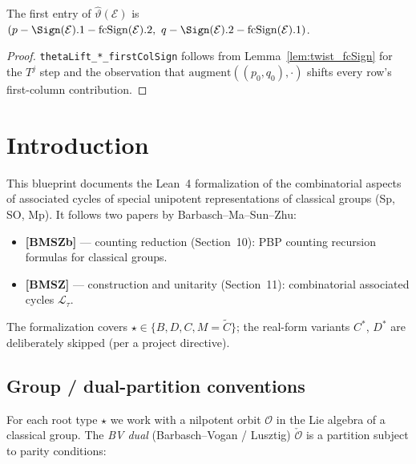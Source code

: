 \begin{theorem}
  \label{thm:thetaLift_first_entry}
  \leanok
  The first entry of $\hat\vartheta(\mathcal{E})$ is $(p - \Sign(\mathcal{E}).1 - \mathrm{fcSign}(\mathcal{E}).2,\ q - \Sign(\mathcal{E}).2 - \mathrm{fcSign}(\mathcal{E}).1)$.
\end{theorem}
\begin{proof}
  \leanok
  \texttt{thetaLift\_*\_firstColSign} follows from Lemma~\ref{lem:twist_fcSign} for the $T^j$ step and the observation that $\mathrm{augment}((p_0, q_0), \cdot)$ shifts every row's first-column contribution.
\end{proof}



\chapter{Introduction}
\label{chap:intro}

This blueprint documents the Lean~4 formalization of the combinatorial
aspects of associated cycles of special unipotent representations of
classical groups (Sp, SO, Mp). It follows two papers by
Barbasch--Ma--Sun--Zhu:

\begin{itemize}
\item \textbf{[BMSZb]} — counting reduction (Section~10): PBP counting recursion formulas for classical groups.
\item \textbf{[BMSZ]} — construction and unitarity (Section~11): combinatorial
      associated cycles $\mathcal{L}_\tau$.
\end{itemize}

The formalization covers $\star \in \{B, D, C, M = \tilde{C}\}$; the real-form
variants $C^*$, $D^*$ are deliberately skipped (per a project directive).

\section{Group / dual-partition conventions}

For each root type $\star$ we work with a nilpotent orbit $\mathcal{O}$ in
the Lie algebra of a classical group. The \emph{BV dual} (Barbasch--Vogan /
Lusztig) $\check{\mathcal{O}}$ is a partition subject to parity conditions:

